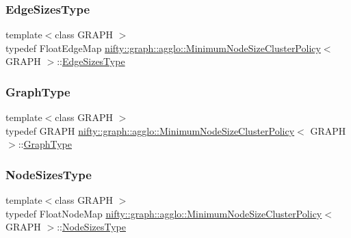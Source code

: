 \subsubsection{\texorpdfstring{Edge\+Sizes\+Type}{EdgeSizesType}}
{\footnotesize\ttfamily template$<$class G\+R\+A\+PH $>$ \\
typedef Float\+Edge\+Map \hyperlink{classnifty_1_1graph_1_1agglo_1_1MinimumNodeSizeClusterPolicy}{nifty\+::graph\+::agglo\+::\+Minimum\+Node\+Size\+Cluster\+Policy}$<$ G\+R\+A\+PH $>$\+::\hyperlink{classnifty_1_1graph_1_1agglo_1_1MinimumNodeSizeClusterPolicy_a645ba7b5aabb0fd8cecad292041d929a}{Edge\+Sizes\+Type}}

\mbox{\label{classnifty_1_1graph_1_1agglo_1_1MinimumNodeSizeClusterPolicy_a6d81a64ca67c9feec052a031552282f0}} 
\subsubsection{\texorpdfstring{Graph\+Type}{GraphType}}
{\footnotesize\ttfamily template$<$class G\+R\+A\+PH $>$ \\
typedef G\+R\+A\+PH \hyperlink{classnifty_1_1graph_1_1agglo_1_1MinimumNodeSizeClusterPolicy}{nifty\+::graph\+::agglo\+::\+Minimum\+Node\+Size\+Cluster\+Policy}$<$ G\+R\+A\+PH $>$\+::\hyperlink{classnifty_1_1graph_1_1agglo_1_1MinimumNodeSizeClusterPolicy_a6d81a64ca67c9feec052a031552282f0}{Graph\+Type}}

\mbox{\label{classnifty_1_1graph_1_1agglo_1_1MinimumNodeSizeClusterPolicy_a64f036ec68ecf74d84f9238f77957c1e}} 
\subsubsection{\texorpdfstring{Node\+Sizes\+Type}{NodeSizesType}}
{\footnotesize\ttfamily template$<$class G\+R\+A\+PH $>$ \\
typedef Float\+Node\+Map \hyperlink{classnifty_1_1graph_1_1agglo_1_1MinimumNodeSizeClusterPolicy}{nifty\+::graph\+::agglo\+::\+Minimum\+Node\+Size\+Cluster\+Policy}$<$ G\+R\+A\+PH $>$\+::\hyperlink{classnifty_1_1graph_1_1agglo_1_1MinimumNodeSizeClusterPolicy_a64f036ec68ecf74d84f9238f77957c1e}{Node\+Sizes\+Type}}




